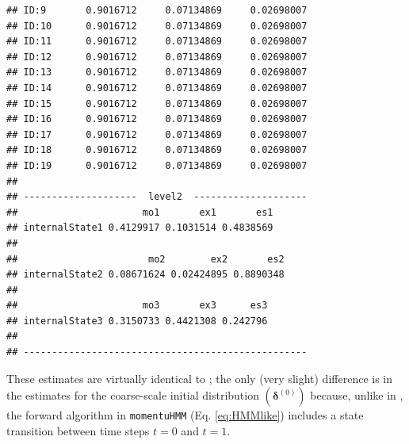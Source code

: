 \documentclass[12pt]{article}\usepackage[]{graphicx}\usepackage[]{color}
\makeatletter
\newenvironment{kframe}{%
 \def\at@end@of@kframe{}%
 \ifinner\ifhmode%
  \def\at@end@of@kframe{\end{minipage}}%
  \begin{minipage}{\columnwidth}%
 \fi\fi%
 \def\FrameCommand##1{\hskip\@totalleftmargin \hskip-\fboxsep
 \colorbox{shadecolor}{##1}\hskip-\fboxsep
     \hskip-\linewidth \hskip-\@totalleftmargin \hskip\columnwidth}%
 \MakeFramed {\advance\hsize-\width
   \@totalleftmargin\z@ \linewidth\hsize
   \@setminipage}}%
 {\par\unskip\endMakeFramed%
 \at@end@of@kframe}
\newenvironment{knitrout}{}{} %
\makeatother
\begin{document}
\begin{knitrout}
\begin{kframe}
\begin{verbatim}
## ID:9       0.9016712     0.07134869     0.02698007
## ID:10      0.9016712     0.07134869     0.02698007
## ID:11      0.9016712     0.07134869     0.02698007
## ID:12      0.9016712     0.07134869     0.02698007
## ID:13      0.9016712     0.07134869     0.02698007
## ID:14      0.9016712     0.07134869     0.02698007
## ID:15      0.9016712     0.07134869     0.02698007
## ID:16      0.9016712     0.07134869     0.02698007
## ID:17      0.9016712     0.07134869     0.02698007
## ID:18      0.9016712     0.07134869     0.02698007
## ID:19      0.9016712     0.07134869     0.02698007
## 
## --------------------  level2  --------------------
##                      mo1       ex1       es1
## internalState1 0.4129917 0.1031514 0.4838569
## 
##                       mo2        ex2       es2
## internalState2 0.08671624 0.02424895 0.8890348
## 
##                      mo3       ex3      es3
## internalState3 0.3150733 0.4421308 0.242796
## 
## --------------------------------------------------
\end{verbatim}
\end{kframe}
\end{knitrout}
\noindent These estimates are virtually identical to \cite{Leos-BarajasEtAl2017}; the only (very slight) difference is in the estimates for the coarse-scale initial distribution $({\boldsymbol \delta}^{(0)})$ because, unlike in \cite{Leos-BarajasEtAl2017}, the forward algorithm in \verb|momentuHMM| (Eq. \ref{eq:HMMlike}) includes a state transition between time steps $t=0$ and $t=1$.
\end{document}
